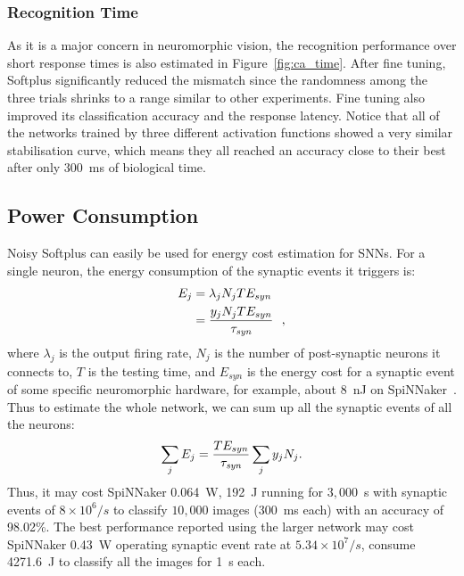 	\subsubsection{Recognition Time}
	As it is a major concern in neuromorphic vision, the recognition performance over short response times is also estimated in Figure~\ref{fig:ca_time}.
	After fine tuning, Softplus significantly reduced the mismatch since the randomness among the three trials shrinks to a range similar to other experiments.
	Fine tuning also improved its classification accuracy and the response latency.
	Notice that all of the networks trained by three different activation functions showed a very similar stabilisation curve, which means they all reached an accuracy close to their best after only 300~ms of biological time. 
	
	
	\subsection{Power Consumption}
	\label{subsec:result_power}
	Noisy Softplus can easily be used for energy cost estimation for SNNs.
	For a single neuron, the energy consumption of the synaptic events it triggers is:
	\begin{equation}
	\begin{aligned}
	E_{j} &= \lambda_j N_j T E_{syn}\\
	&= \dfrac{y_j N_j T E_{syn}}{\tau_{\textit{\textrm{syn}}}}~~,
	\end{aligned}
	\label{equ:energy}
	\end{equation}
	where $\lambda_j$ is the output firing rate, $N_j$ is the number of post-synaptic neurons it connects to, $T$ is the testing time, and $E_{syn}$ is the energy cost for a synaptic event of some specific neuromorphic hardware, for example, about 8~nJ on SpiNNaker~\citep{stromatias2013power}.
	Thus to estimate the whole network, we can sum up all the synaptic events of all the neurons:
	\begin{equation}
	\sum_j E_{j} =  \dfrac{T E_{syn}}{\tau_{\textit{\textrm{syn}}}} \sum_{j}y_j N_j.
	\end{equation}
	Thus, it may cost SpiNNaker 0.064~W, 192~J running for $3,000$~s with synaptic events of $8\times10^6/s$ to classify $10,000$ images (300~ms each) with an accuracy of 98.02\%.
	The best performance reported using the larger network may cost SpiNNaker 0.43~W operating synaptic event rate at $5.34\times10^7/s$, consume 4271.6~J to classify all the images for 1~s each.

